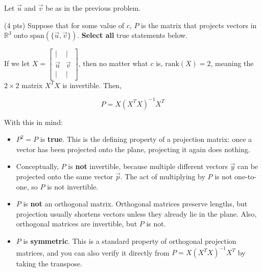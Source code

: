 \documentclass[11pt]{article}
\begin{document}
\vspace{-0.5cm}


\begin{prob}
Let $\vec u$ and $\vec v$ be as in the previous problem.
\begin{subprob}(4 pts) Suppose that for some value of $c$, $P$ is the matrix that projects vectors in $\mathbb{R}^3$ onto $\text{span}(\{\vec u, \vec v\})$. \textbf{Select all} true statements below. \\

   

\begin{solution}
If we let $X = \begin{bmatrix} | & | \\ \vec u & \vec v \\ | & | \end{bmatrix}$, then no matter what $c$ is, $\text{rank}(X) = 2$, meaning the $2 \times 2$ matrix $X^TX$ is invertible. Then,

$$P = X (X^TX)^{-1}X^T$$

With this in mind:

\begin{itemize}
    \item $P^2 = P$ is \textbf{true}. This is the defining property of a projection matrix: once a vector has been projected onto the plane, projecting it again does nothing.
    \item Conceptually, $P$ is \textbf{not} invertible, because multiple different vectors $\vec y$ can be projected onto the same vector $\vec p$. The act of multiplying by $P$ is not one-to-one, so $P$ is not invertible.
    \item $P$ is \textbf{not} an orthogonal matrix. Orthogonal matrices preserve lengths, but projection usually shortens vectors unless they already lie in the plane. Also, orthogonal matrices are invertible, but $P$ is not.
    \item $P$ is \textbf{symmetric}. This is a standard property of orthogonal projection matrices, and you can also verify it directly from $P = X(X^TX)^{-1}X^T$ by taking the transpose.
\end{itemize}
\end{solution}

\end{subprob}


\end{prob}
\end{document}
